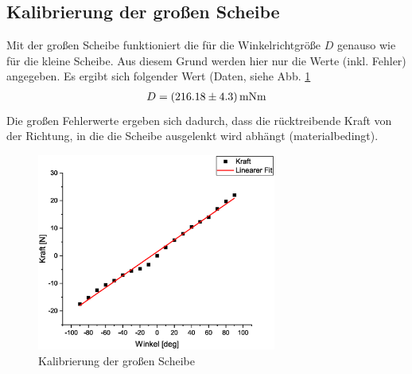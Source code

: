 \subsection{Kalibrierung der großen Scheibe}
Mit der großen Scheibe funktioniert die für die Winkelrichtgröße $D$ genauso wie für die kleine Scheibe. Aus diesem Grund werden hier nur die Werte (inkl. Fehler) angegeben. Es ergibt sich folgender Wert (Daten, siehe Abb. \ref{fig:kal2}
\begin{align*}
D = \unit[(216.18 \pm 4.3)]{mN m}
\end{align*}
Die großen Fehlerwerte ergeben sich dadurch, dass die rücktreibende Kraft von der Richtung, in die die Scheibe ausgelenkt wird abhängt (materialbedingt).

\begin{figure}[hb!]
\begin{center}
\includegraphics[width=0.7\textwidth]{Bilder/kal2.eps}
\caption{Kalibrierung der großen Scheibe}
\label{fig:kal2}
\end{center}
\end{figure}